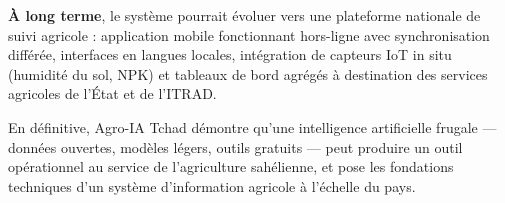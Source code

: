 \medskip

\textbf{À long terme}, le système pourrait évoluer vers une
plateforme nationale de suivi agricole : application mobile
fonctionnant hors-ligne avec synchronisation différée, interfaces
en langues locales, intégration de capteurs IoT in situ
(humidité du sol, NPK) et tableaux de bord agrégés à destination
des services agricoles de l'État et de l'ITRAD.

\medskip

En définitive, Agro-IA Tchad démontre qu'une intelligence
artificielle frugale --- données ouvertes, modèles légers, outils
gratuits --- peut produire un outil opérationnel au service de
l'agriculture sahélienne, et pose les fondations techniques d'un
système d'information agricole à l'échelle du pays.